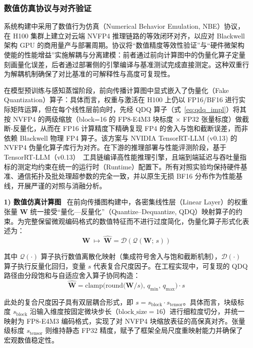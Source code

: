 \documentclass[11pt, a4paper]{article}
\begin{document}
\subsubsection{数值仿真协议与对齐验证}

系统构建中采用了数值行为仿真（Numerical Behavior Emulation, NBE）协议，在 H100 集群上建立对云端 NVFP4 推理链路的等效闭环对齐，以应对 Blackwell 架构 GPU 的商用量产与部署周期。协议将“数值精度等效性验证”与“硬件微架构使能的性能增益”实施解耦与分离建模：前者通过前向计算图中的伪量化算子定量刻画量化误差，后者通过部署侧的引擎编译与基准测试完成直接测定。这种双重行为解耦机制确保了对比基准的可解释性与高度可复现性。

在模型预训练与感知蒸馏阶段，前向传播计算图中显式嵌入了伪量化（Fake Quantization）算子：具体而言，权重与激活在 H100 上仍以 FP16/BF16 进行实际矩阵运算，但在每个线性层前向时，先经 QDQ 算子（式~\ref{eq:qdq_impl}）将其按 NVFP4 的两级缩放（block=16 的 FP8-E4M3 块标度 $\times$ FP32 张量标度）做截断-反量化，从而在 FP16 计算精度下精确复现 FP4 的舍入与饱和截断误差，而非依赖 Blackwell 物理 FP4 算子。该方案与 NVIDIA TensorRT-LLM (v0.13) 的 NVFP4 伪量化算子库行为对齐。在下游的推理部署与性能评测阶段，基于 TensorRT-LLM（v0.13）~\cite{NVIDIA2024TRTLLMReleaseNotes,NVIDIA2024TensorRTLLMDocs}工具链编译高性能推理引擎，且端到端延迟与吞吐量指标的测定均约束在统一的运行时（Runtime）配置下。所有对照实验均保持硬件基准、通信拓扑及批处理超参数的完全一致，并以原生无损 BF16 分布作为性能基线，开展严谨的对照与消融分析。

\textbf{1) 数值仿真计算图}
~在前向传播图构建中，各密集线性层（Linear Layer）的权重张量 $\bm{W}$ 统一接受“量化—反量化”（Quantize--Dequantize, QDQ）映射算子的约束。为完整保留微观编码格式的数值特征而不进行过度简化，伪量化算子形式化表述为：
\begin{equation}
\label{eq:fake_quant}
    \bm{W}\ \mapsto\ \widehat{\bm{W}} = \mathcal{D}\!\left(\mathcal{Q}\!\left(\bm{W};\, s\right)\right)
\end{equation}

其中 $\mathcal{Q}(\cdot)$ 算子执行数值离散化映射（集成符号舍入与饱和截断机制），$\mathcal{D}(\cdot)$ 算子执行反量化回归，变量 $s$ 代表复合尺度因子。在工程实现中，可复现的 QDQ 路径由分段饱和与自适应舍入算子协同构造：
\begin{equation}
\label{eq:qdq_impl}
    \widehat{\bm{W}} = \mathrm{clamp}\!\Big(\mathrm{round}\!\big(\bm{W}/s\big),\, q_{\min},\, q_{\max}\Big)\cdot s
\end{equation}

此处的复合尺度因子具有双层耦合形式，即 $s = s_{\text{block}}\cdot s_{\text{tensor}}$。具体而言，块级标度 $s_{\text{block}}$ 沿输入维度按固定微块步长（$\text{block\_size}=16$）进行细粒度切分，并统一映射为 FP8-E4M3 编码格式，实现了对 NVFP4 块缩放表征的高保真对齐。张量级标度 $s_{\text{tensor}}$ 则维持静态 FP32 精度，赋予了框架全局尺度重映射能力并确保了宏观数值稳定性。
\end{document}
